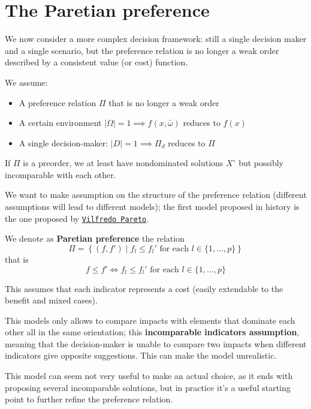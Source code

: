\chapter{The Paretian preference}
\label{ch:paretian}

We now consider a more complex decision framework: still a single decision maker and a single scenario, but the preference relation is no longer a weak order described by a consistent value (or cost) function.

We assume: 
\begin{itemize}
	\item A preference relation $\Pi$ that is no longer a weak order
	
	\item A certain environment $|\Omega| = 1 \implies f(x, \bar \omega)$ reduces to $f(x)$
	
	\item A single decision-maker: $|D| = 1 \implies \Pi_d$ reduces to $\Pi$
\end{itemize}
If $\Pi$ is a preorder, we at least have nondominated solutions $X^\circ$ but possibly incomparable with each other. 

We want to make assumption on the structure of the preference relation (different assumptions will lead to different models); the first model proposed in history is the one proposed by \href{https://en.wikipedia.org/wiki/Vilfredo_Pareto}{\texttt{Vilfredo Pareto}}. \\

\begin{definition}
	We denote as \textbf{Paretian preference} the relation
	$$ \Pi = \left\{(f, f') \mid f_l \leq f_l' \text{ for each } l \in \{1, \dots, p\}\right\} $$
	that is
	$$ f \leq f' \Leftrightarrow f_l \leq f_l' \text{ for each } l \in \{1, \dots, p\} $$
\end{definition}

This assumes that each indicator represents a cost (easily extendable to the benefit and mixed cases). 

This models only allows to compare impacts with elements that dominate each other all in the same orientation; this \textbf{incomparable indicators assumption}, meaning that the decision-maker is unable to compare two impacts when different indicators give opposite suggestions. This can make the model unrealistic.

This model can seem not very useful to make an actual choice, as it ends with proposing several incomparable solutions, but in practice it's a useful starting point to further refine the preference relation.

